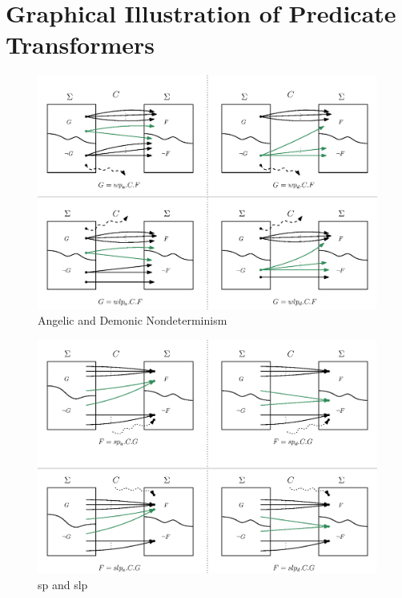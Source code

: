 \renewcommand\thefigure{\thechapter.\arabic{figure}}  

\chapter{Graphical Illustration of Predicate Transformers}

\begin{figure}[ht!]\centering
\includegraphics[width=\textwidth]{image/wp-wlp-angelic-demonic.eps}
\caption{Angelic and Demonic Nondeterminism}
\label{fig:ang-dem}
\end{figure}


\begin{figure}[ht!]\centering
\includegraphics[width=\textwidth]{image/sp-slp.eps}
\caption{sp and slp}
\label{fig:sp-slp}
\end{figure}

